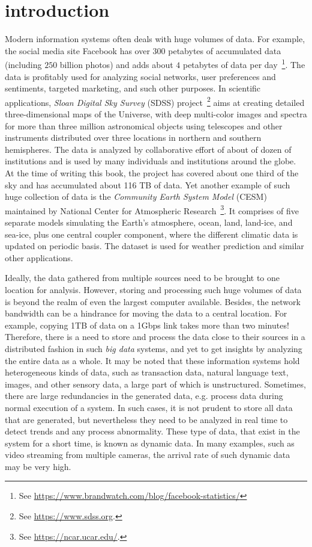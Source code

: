 \section{introduction}

Modern information systems often deals with huge volumes of data. For example, the social media site Facebook has over $300$ petabytes 
of accumulated data (including $250$ billion photos) and adds about $4$ petabytes of data per day~\footnote{See 
\url{https://www.brandwatch.com/blog/facebook-statistics/}}. The data is profitably used for analyzing social 
networks, user preferences and sentiments, targeted marketing, and such other purposes. 
%
In scientific applications, {\em Sloan Digital Sky Survey} (SDSS) project~\footnote{See \url{https://www.sdss.org}.} aims at creating 
detailed three-dimensional maps of the Universe, with deep multi-color images and spectra for more than three million astronomical 
objects using telescopes and other instruments distributed over three locations in northern and southern hemispheres. The data 
is analyzed by collaborative effort of about of dozen of institutions and is used by many individuals and institutions around the 
globe. At the time of writing this book, the project has covered about one third of the sky and has accumulated about 116 TB of data. 
%
Yet another example of such huge collection of data is the {\em Community Earth System Model} (CESM) maintained by National Center 
for Atmospheric Research~\footnote{See \url{https://ncar.ucar.edu/}.}. It comprises of five separate models simulating the Earth's 
atmosphere, ocean, land, land-ice, and sea-ice, plus one central coupler component, where the different climatic data is updated 
on periodic basis. The dataset is used for weather prediction and similar other applications.

Ideally, the data gathered from multiple sources need to be brought to one location for analysis. However, storing and processing 
such huge volumes of data is beyond the realm of even the largest computer available. Besides, the network bandwidth can be a 
hindrance for moving the data to a central location. For example, copying 1TB of data on a 1Gbps link takes more than two minutes!
%
Therefore, there is a need to store and process the data close to their sources in a distributed fashion in such {\em big data}
systems, and yet to get insights by analyzing the entire data as a whole. It may be noted that these information systems hold 
heterogeneous kinds of data, such as transaction data, natural language text, images, and other sensory data, a large part of 
which is unstructured.
Sometimes, there are large redundancies in the generated data, e.g. process data during normal execution of a system. In such
cases, it is not prudent to store all data that are generated, but nevertheless they need to be analyzed in real time to 
detect trends and any process abnormality. These type of data, that exist in the system for a short time, is known as dynamic
data. In many examples, such as video streaming from multiple cameras, the arrival rate of such dynamic data may be very high.

